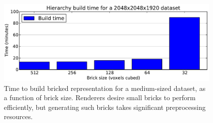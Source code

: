 \begin{figure}[tb]
  \centering
  \includegraphics[width=0.98\linewidth]{images/rg/HierarchyBuildTime.pdf}
  \caption{Time to build bricked representation for a medium-sized dataset,
  as a function of brick size.  Renderers desire small bricks to
  perform efficiently, but generating such bricks takes significant
  preprocessing resources.}
  \label{fig:hierarchy-build}
\end{figure}


